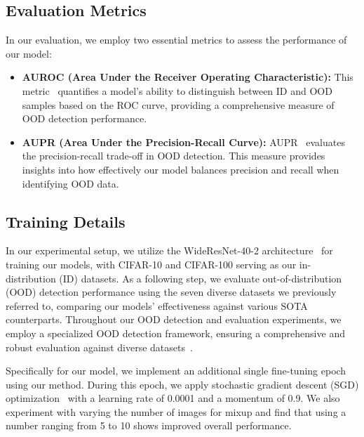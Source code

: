 \documentclass[letterpaper]{article} %
\begin{document}
\subsection{Evaluation Metrics}
In our evaluation, we employ two essential metrics to assess the performance of our model:
\begin{itemize}
    \item \textbf{AUROC (Area Under the Receiver Operating Characteristic):} This metric~\cite{AUROC} quantifies a model's ability to distinguish between ID and OOD samples based on the ROC curve, providing a comprehensive measure of OOD detection performance.
    \item \textbf{AUPR (Area Under the Precision-Recall Curve):} AUPR~\cite{AUPR} evaluates the precision-recall trade-off in OOD detection. This measure provides insights into how effectively our model balances precision and recall when identifying OOD data.
\end{itemize}
\subsection{Training Details}
In our experimental setup, we utilize the WideResNet-40-2 architecture~\cite{WideResnet} for training our models, with CIFAR-10 and CIFAR-100 serving as our in-distribution (ID) datasets. As a following step, we evaluate out-of-distribution (OOD) detection performance using the seven diverse datasets we previously referred to, comparing our models' effectiveness against various SOTA counterparts. Throughout our OOD detection and evaluation experiments, we employ a specialized OOD detection framework, ensuring a comprehensive and robust evaluation against diverse datasets~\cite{kirchheim2022pytorch}.

Specifically for our model, we implement an additional single fine-tuning epoch using our method. During this epoch, we apply stochastic gradient descent (SGD) optimization~\cite{SGD} with a learning rate of 0.0001 and a momentum of 0.9. We also experiment with varying the number of images for mixup and find that using a number ranging from 5 to 10 shows improved overall performance.
\end{document}
